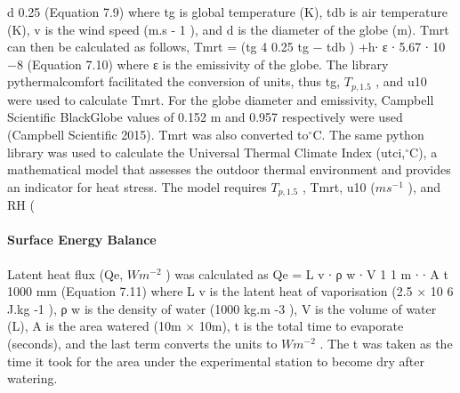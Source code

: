 \documentclass[final,3p,times,authoryear]{elsarticle}
\begin{document}
{
d
0.25
(Equation 7.9)
where tg is global temperature (K), tdb is air temperature (K), v is the wind speed (m.s -
1
), and d is the diameter of the globe (m). \gls{Tmrt} can then be calculated as follows,
\gls{Tmrt} = (tg
4
0.25
tg − tdb
)
+h∙
ε ∙ 5.67 ∙ 10 −8
(Equation 7.10)
where ε is the emissivity of the globe.
The library pythermalcomfort facilitated the conversion of units, thus \gls{tg}, $T_{p,1.5}$ , and \gls{u10}
were used to calculate \gls{Tmrt}. For the globe diameter and emissivity, Campbell Scientific BlackGlobe values of 0.152 m and 0.957 respectively were used (Campbell Scientific
2015). \gls{Tmrt} was also converted to$^{\circ}$C.
The same python library was used to calculate the Universal Thermal Climate Index
(\gls{utci},$^{\circ}$C), a mathematical model that assesses the outdoor thermal environment and
provides an indicator for heat stress. The model requires $T_{p,1.5}$ , \gls{Tmrt}, \gls{u10} ($ms^{-1}$ ), and RH
(%


\paragraph{Surface Energy Balance}\label{sec:appendix7.4.5}

Latent heat flux (\gls{Qe}, $Wm^{-2}$ ) was calculated as
\gls{Qe} = L v ∙ ρ w ∙
V 1
1 m
∙ ∙
A t 1000 mm
(Equation 7.11)
where L v is the latent heat of vaporisation (2.5 × 10 6 J.kg -1 ), ρ w is the density of water
(1000 kg.m -3 ), V is the volume of water (L), A is the area watered (10m × 10m), t is
the total time to evaporate (seconds), and the last term converts the units to $Wm^{-2}$ . The t
was taken as the time it took for the area under the experimental station to become dry
after watering.

}
\end{document}
